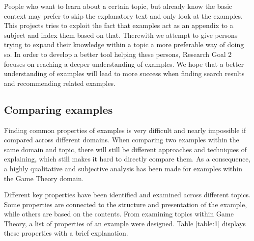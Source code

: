 People who want to learn about a certain topic, but already know the basic context may prefer to skip the explanatory text and only look at the examples. This projects tries to exploit the fact that examples act as an appendix to a subject and index them based on that. Therewith we attempt to give persons trying to expand their knowledge within a topic a more preferable way of doing so. In order to develop a better tool helping these persons, Research Goal 2 focuses on reaching a deeper understanding of examples. We hope that a better understanding of examples will lead to more success when finding search results and recommending related examples.

\subsection{Comparing examples} \label{comparing_examples}

Finding common properties of examples is very difficult and nearly impossible if  compared across different domains. When comparing two examples within the same domain and topic, there will still be different approaches and techniques of explaining, which still makes it hard to directly compare them. As a consequence, a highly qualitative and subjective analysis has been made for examples within the Game Theory domain. 

Different key properties have been identified and examined across different topics. Some properties are connected to the structure and presentation of the example, while others are based on the contents. From examining topics within Game Theory, a list of properties of an example were designed. Table \ref{table:1} displays these properties with a brief explanation.

